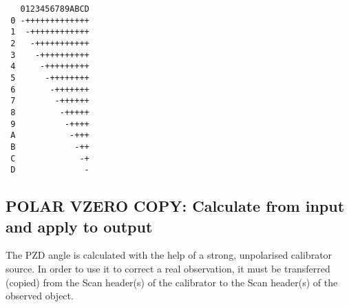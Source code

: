 \spbegin %
\spend %
%
\spbegin %
\suser{\scr}
\spend %
%
\spbegin %
\suser{\scr}
\spend %
%
\spbegin %
\suser{\scr}
\spend %
%
\spbegin %
\sdefault{= *:}
\suser{\scr} %
\svbegin \begin{verbatim}
   0123456789ABCD
 0 -+++++++++++++
 1  -++++++++++++
 2   -+++++++++++
 3    -++++++++++
 4     -+++++++++
 5      -++++++++
 6       -+++++++
 7        -++++++
 8         -+++++
 9          -++++
 A           -+++
 B            -++
 C             -+
 D              -
\end{verbatim}\svend
\spend %
%
\spbegin %
\suser{\scr}
\spend %

\subsection{POLAR VZERO COPY: Calculate from input and apply to output}
\label{.vzero.copy}

The PZD angle is calculated with the help of a strong, unpolarised calibrator
source. In order to use it to correct a real observation, it must be
transferred (copied) from the Scan header(s) of the calibrator to the Scan
header(s) of the observed object.

